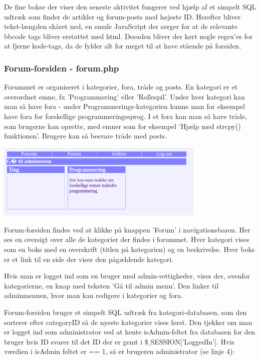 \documentclass{article}
\begin{document}
De fine bokse der viser den seneste aktivitet fungerer ved hjælp af et simpelt SQL udtræk som finder de artikler og forum-posts med højeste ID. Herefter bliver tekst-længden skåret ned, en smule JavaScript der sørger for at de relevante bbcode tags bliver erstattet med html. Desuden bliver der kørt nogle regex'es for at fjerne kode-tags, da de fylder alt for meget til at have stående på forsiden.

\subsubsection[Forum-forsiden]{Forum-forsiden - forum.php}
Forummet er organiseret i kategorier, fora, tråde og posts. En kategori er et overordnet emne, fx 'Programmering' eller 'Rollespil'. Under hver kategori kan man så have fora - under Programmerings-kategorien kunne man for eksempel have fora for forskellige programmeringssprog. I et fora kan man så have tråde, som brugerne kan oprette, med emner som for eksempel 'Hjælp med strcpy() funktionen'. Brugere kan så besvare tråde med posts.

\includegraphics[width=100mm]{mi06.png}

Forum-forsiden findes ved at klikke på knappen 'Forum' i navigationsbaren. Her ses en oversigt over alle de kategorier der findes i forummet. Hver kategori vises som en boks med en overskrift (titlen på kategorien) og en beskrivelse. Hver boks er et link til en side der viser den pågældende kategori.

Hvis man er logget ind som en bruger med admin-rettigheder, vises der, ovenfor kategorierne, en knap med teksten 'Gå til admin menu'. Den linker til adminmenuen, hvor man kan redigere i kategorier og fora.

Forum-forsiden bruger et simpelt SQL udtræk fra kategori-databasen, som den sorterer efter categoryID så de nyeste kategorier vises først. Den tjekker om man er logget ind som administrator ved at hente isAdmin-feltet fra databasen for den bruger hvis ID svarer til det ID der er gemt i $\$$$\_$SESSION['LoggedIn']. Hvis værdien i isAdmin feltet er == 1, så er brugeren administrator (se linje 4):
\end{document}
